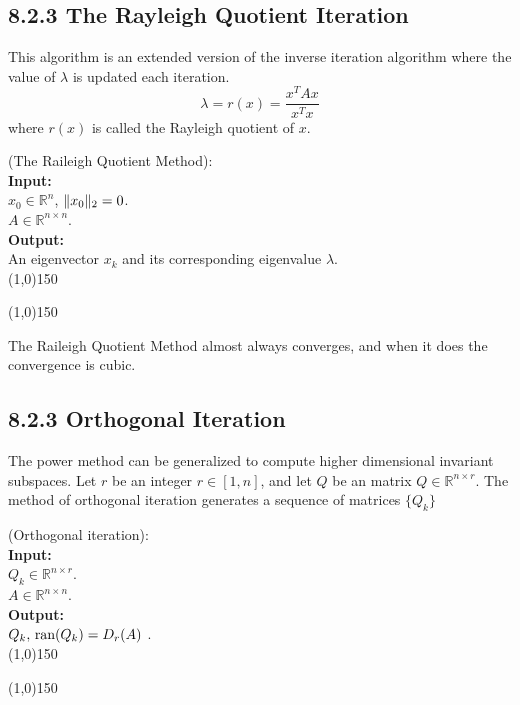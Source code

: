 
\subsection*{8.2.3 The Rayleigh Quotient Iteration} %
This algorithm is an extended version of the inverse iteration algorithm where
the value of $\lambda$ is updated each iteration.
\begin{equation}
	\lambda = r(x) = \frac{x^TAx}{x^Tx}
\end{equation}
where $r(x)$ is called the Rayleigh quotient of $x$.
%
%
\begin{algo}
{
%
	(The Raileigh Quotient Method):
%
}\\
\textbf{Input: }
{
%
	\\$x_0\in\mathbb R^n$, $\lVert{x_0}\rVert_2=0$.
	\\$A\in\mathbb R^{n\times n}$.
%
}\\
\textbf{Output: }
{
%
	\\An eigenvector $x_k$ and its corresponding eigenvalue $\lambda$.
%
}\\
\line(1,0){150}
\begin{algorithmic}
%
\EndFor{}
%
\end{algorithmic}
\line(1,0){150}
\end{algo}
%
%
The Raileigh Quotient Method almost always converges, and when it does the convergence is cubic.


\subsection*{8.2.3 Orthogonal Iteration}

The power method can be generalized to compute higher dimensional invariant subspaces.
Let $r$ be an integer $r\in[1,n]$, and let $Q$ be an matrix $Q\in\mathbb R^{n\times r}$.
The method of orthogonal iteration generates a sequence of matrices $\{ Q_k \}$
%
%
\begin{algo}
{
%
	(Orthogonal iteration):
%
}\\
\textbf{Input: }
{
%
	\\$Q_k\in\mathbb R^{n\times r}$.
	\\$A\in\mathbb R^{n\times n}$.
%
}\\
\textbf{Output: }
{
%
	\\$Q_k,\,\text{ran}({Q_k})=D_r(A)$ .
%
}\\
\line(1,0){150}
\begin{algorithmic}
%
\EndFor{}
%
\end{algorithmic}
\line(1,0){150}
\end{algo}
%
%


